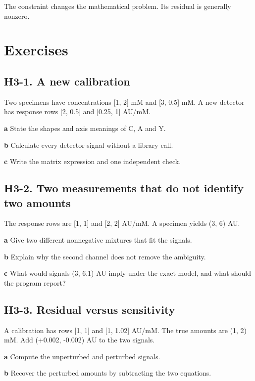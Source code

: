 \documentclass[11pt,letterpaper]{article}
\theoremstyle{definition}\newtheorem{definition}{Definition}\newtheorem{example}{Example}
\numberwithin{equation}{section}
\begin{document}
The constraint changes the mathematical problem. Its residual is generally nonzero.
\bigskip
\section*{Exercises}
\par\noindent\begin{minipage}{\linewidth}
\subsection*{H3-1. A new calibration}
Two specimens have concentrations [1, 2] mM and [3, 0.5] mM. A new detector has response rows [2, 0.5] and [0.25, 1] AU/mM.

\textbf{a} State the shapes and axis meanings of C, A and Y.

\end{minipage}\par\medskip
\textbf{b} Calculate every detector signal without a library call.

\textbf{c} Write the matrix expression and one independent check.

\par\noindent\begin{minipage}{\linewidth}
\subsection*{H3-2. Two measurements that do not identify two amounts}
The response rows are [1, 1] and [2, 2] AU/mM. A specimen yields (3, 6) AU.

\textbf{a} Give two different nonnegative mixtures that fit the signals.

\end{minipage}\par\medskip
\textbf{b} Explain why the second channel does not remove the ambiguity.

\textbf{c} What would signals (3, 6.1) AU imply under the exact model, and what should the program report?

\par\noindent\begin{minipage}{\linewidth}
\subsection*{H3-3. Residual versus sensitivity}
A calibration has rows [1, 1] and [1, 1.02] AU/mM. The true amounts are (1, 2) mM. Add (+\allowbreak{}0.002, -0.002) AU to the two signals.

\textbf{a} Compute the unperturbed and perturbed signals.

\end{minipage}\par\medskip
\textbf{b} Recover the perturbed amounts by subtracting the two equations.
\end{document}
